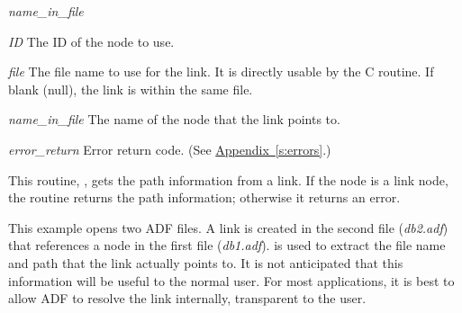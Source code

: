 \begin{Ventryi}{\textit{name\_in\_file}}
\item[\textit{ID}]
     The ID of the node to use.
\item[\textit{file}]
     The file name to use for the link.
     It is directly usable by the C  routine.
     If blank (null), the link is within the same file.
\item[\textit{name\_in\_file}]
     The name of the node that the link points to.
\item[\textit{error\_return}]
     Error return code.
     (See \hyperref[s:errors]{Appendix~\ref*{s:errors}}.)
\end{Ventryi}

This routine, , gets the path information from
a link.
If the node is a link node, the routine returns the path information;
otherwise it returns an error.

\Example

This example opens two ADF files.
A link is created in the second file (\textit{db2.adf}) that references a
node in the first file (\textit{db1.adf}).
 is used to extract the file name and path that the link
actually points to.
It is not anticipated that this information will be useful to the normal
user.
For most applications, it is best to allow ADF to resolve the link
internally, transparent to the user.

